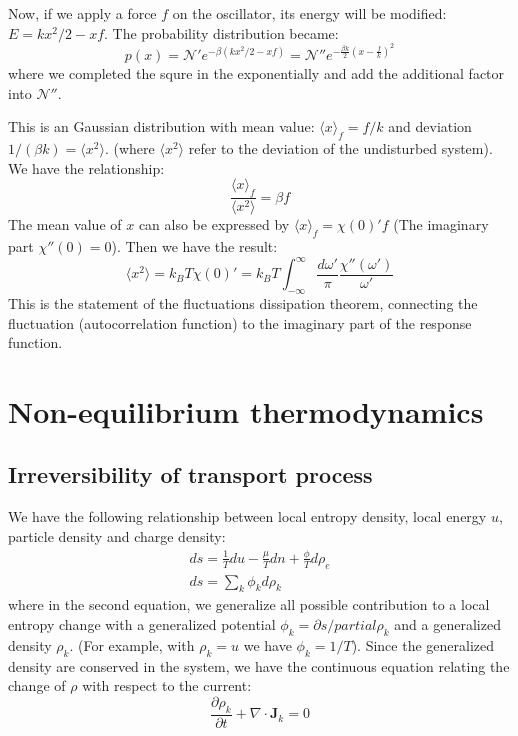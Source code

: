 \documentclass{article}
\newcommand{\pfrac}[2]{\frac{\partial #1}{\partial #2}}
\begin{document}
Now, if we apply a force $f$ on the oscillator, its energy will be modified:
$E = kx^2/2 - xf$. The probability distribution became:
\begin{equation}
    p(x) = \mathcal{N}' e^{-\beta(kx^2/2 - xf)} = \mathcal{N}'' e^{-\frac{\beta k}{2} (x - \frac{f}{k})^2 }
\end{equation}
where we completed the squre in the exponentially and add the additional 
factor into $\mathcal{N}''$. 

This is an Gaussian distribution with mean value: $\langle x \rangle_f = f/k$ and 
deviation $1/(\beta k) = \langle x^2 \rangle$. (where $\langle x^2 \rangle$ refer to the 
deviation of the undisturbed system). 
We have the relationship:
\begin{equation}
    \frac{\langle x \rangle_f}{\langle x^2 \rangle} = \beta f
\end{equation}
The mean value of $x$ can also be expressed by $\langle x \rangle_f = \chi(0)' f $
(The imaginary part $\chi''(0) = 0$). Then we have the result:
\begin{equation}
    \langle x^2 \rangle = k_B T \chi(0)' = 
    k_BT\int_{-\infty}^{\infty} \frac{d\omega'}{\pi} \frac{\chi''(\omega')}{\omega'} \label{fdt}
\end{equation}
This is the statement of the fluctuations dissipation theorem, connecting the 
fluctuation (autocorrelation function) to the imaginary part of the response function.

\section{Non-equilibrium thermodynamics}
\subsection{Irreversibility of transport process}
We have the following relationship between local entropy density, local energy $u$, particle density and 
charge density:
\begin{gather}
    ds = \frac{1}{T} du - \frac{\mu}{T} dn + \frac{\phi}{T} d\rho_e \\
    ds = \sum_k \phi_k d\rho_k
\end{gather}
where in the second equation, we generalize all possible contribution to a local entropy change 
with a generalized potential $\phi_k = \partial s / partial \rho_k$ and a generalized density $\rho_k$. 
(For example, with $\rho_k = u$ we have $\phi_k = 1/T$). 
Since the generalized density are conserved in the system, we have the continuous equation relating the 
change of $\rho$ with respect to the current:
\begin{equation}
    \pfrac{\rho_k}{t} + \nabla \cdot \mathbf{J}_{k} = 0
\end{equation}
\end{document}
